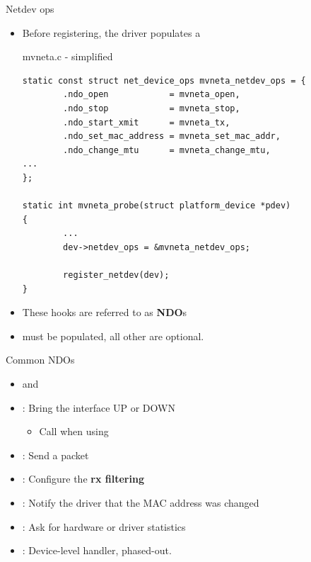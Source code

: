 \begin{frame}[fragile]{Netdev ops}
	\begin{itemize}
		\item Before registering, the driver populates a 
	\begin{block}{mvneta.c - simplified}
		{\fontsize{8}{7}\selectfont
		\begin{verbatim}
static const struct net_device_ops mvneta_netdev_ops = {
        .ndo_open            = mvneta_open,
        .ndo_stop            = mvneta_stop,
        .ndo_start_xmit      = mvneta_tx,
        .ndo_set_mac_address = mvneta_set_mac_addr,
        .ndo_change_mtu      = mvneta_change_mtu,
...
};

static int mvneta_probe(struct platform_device *pdev)
{
        ...
        dev->netdev_ops = &mvneta_netdev_ops;

        register_netdev(dev);
}
		\end{verbatim}
		}
	\end{block}
	\item These hooks are referred to as \textbf{NDO}s
	\item {} must be populated, all other are optional.
	\end{itemize}
\end{frame}

\begin{frame}{Common NDOs}
	\begin{itemize}
		\item {} and \item {} : Bring the interface UP or DOWN
			\begin{itemize}
				\item Call when using 
			\end{itemize}
		\item {} : Send a packet
		\item {} : Configure the \textbf{rx filtering}
		\item {} : Notify the driver that the MAC address was changed
		\item {} : Ask for hardware or driver statistics
		\item {} : Device-level  handler, phased-out.
	\end{itemize}
\end{frame}

